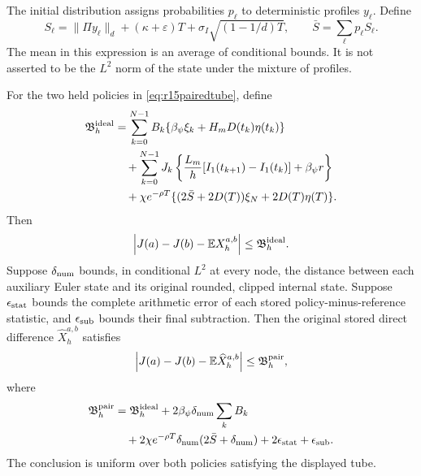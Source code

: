 The initial distribution assigns probabilities $p_\ell$ to deterministic
profiles $y_\ell$. Define
\begin{equation}
 S_\ell=\|\Pi y_\ell\|_d+(\kappa+\varepsilon)T
              +\sigma_I\sqrt{(1-1/d)T},
 \qquad \bar S=\sum_\ell p_\ell S_\ell.
 \label{eq:r15pairedspread}
\end{equation}
The mean in this expression is an average of conditional bounds. It is not
asserted to be the $L^2$ norm of the state under the mixture of profiles.

\begin{proposition}
\label{prop:r15pairedtransfer}
For the two held policies in \eqref{eq:r15pairedtube}, define
\begin{align}
 \mathfrak B_h^{\rm ideal}
 &=\sum_{k=0}^{N-1}B_k
          \{\beta_\psi\xi_k+H_mD(t_k)\eta(t_k)\}\notag\\
 &\quad+\sum_{k=0}^{N-1}J_k
       \left\{\frac{L_m}{h}[I_1(t_{k+1})-I_1(t_k)]
                                +\beta_\psi r\right\}\notag\\
 &\quad+\chi e^{-\rho T}
       \{(2\bar S+2D(T))\xi_N+2D(T)\eta(T)\}.
 \label{eq:r15pairedidealbound}
\end{align}
Then
\begin{equation}
 \left|J(a)-J(b)-\mathbb E X_h^{a,b}\right|
                       \leq\mathfrak B_h^{\rm ideal}.
 \label{eq:r15pairedidealclaim}
\end{equation}
Suppose $\delta_{\rm num}$ bounds, in conditional $L^2$ at every node,
the distance between each auxiliary Euler state and its original rounded,
clipped internal state. Suppose $\epsilon_{\rm stat}$ bounds the complete
arithmetic error of each stored policy-minus-reference statistic, and
$\epsilon_{\rm sub}$ bounds their final subtraction. Then the original
stored direct difference $\widehat X_h^{a,b}$ satisfies
\begin{equation}
 \left|J(a)-J(b)-\mathbb E\widehat X_h^{a,b}\right|
                       \leq\mathfrak B_h^{\rm pair},
 \label{eq:r15pairedimplementedclaim}
\end{equation}
where
\begin{align}
 \mathfrak B_h^{\rm pair}
 &=\mathfrak B_h^{\rm ideal}
       +2\beta_\psi\delta_{\rm num}\sum_kB_k\notag\\
 &\quad+2\chi e^{-\rho T}\delta_{\rm num}
                           (2\bar S+\delta_{\rm num})
       +2\epsilon_{\rm stat}+\epsilon_{\rm sub}.
 \label{eq:r15pairedimplementedbound}
\end{align}
The conclusion is uniform over both policies satisfying the displayed tube.
\end{proposition}

